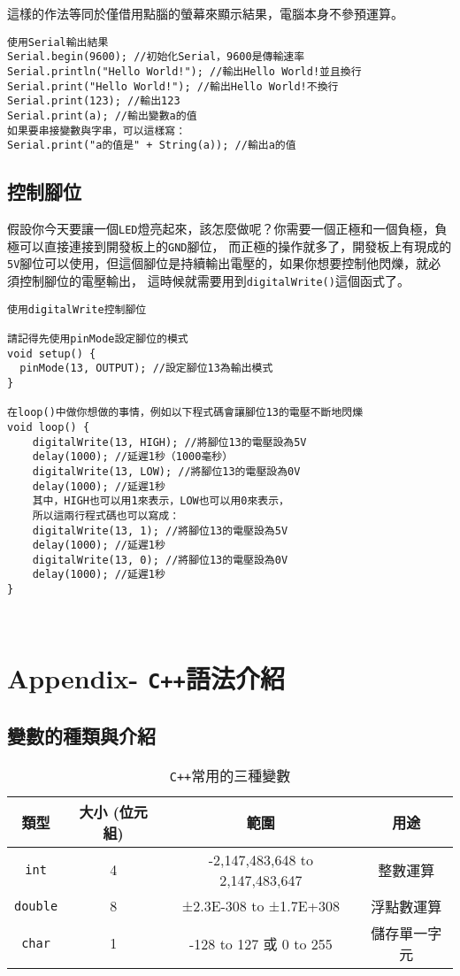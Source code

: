 \documentclass[12pt,a4paper]{article}
\begin{document}
這樣的作法等同於僅借用點腦的螢幕來顯示結果，電腦本身不參預運算。

\begin{lstlisting}
使用Serial輸出結果
Serial.begin(9600); //初始化Serial，9600是傳輸速率
Serial.println("Hello World!"); //輸出Hello World!並且換行
Serial.print("Hello World!"); //輸出Hello World!不換行
Serial.print(123); //輸出123
Serial.print(a); //輸出變數a的值
如果要串接變數與字串，可以這樣寫：
Serial.print("a的值是" + String(a)); //輸出a的值
\end{lstlisting}

\subsection{控制腳位}
假設你今天要讓一個\texttt{LED}燈亮起來，該怎麼做呢？你需要一個正極和一個負極，負極可以直接連接到開發板上的\texttt{GND}腳位，
而正極的操作就多了，開發板上有現成的\texttt{5V}腳位可以使用，但這個腳位是持續輸出電壓的，如果你想要控制他閃爍，就必須控制腳位的電壓輸出，
這時候就需要用到\texttt{digitalWrite()}這個函式了。
\begin{lstlisting}    
使用digitalWrite控制腳位

請記得先使用pinMode設定腳位的模式
void setup() {
  pinMode(13, OUTPUT); //設定腳位13為輸出模式
}

在loop()中做你想做的事情，例如以下程式碼會讓腳位13的電壓不斷地閃爍
void loop() {
    digitalWrite(13, HIGH); //將腳位13的電壓設為5V
    delay(1000); //延遲1秒（1000毫秒）
    digitalWrite(13, LOW); //將腳位13的電壓設為0V 
    delay(1000); //延遲1秒
    其中，HIGH也可以用1來表示，LOW也可以用0來表示，
    所以這兩行程式碼也可以寫成：
    digitalWrite(13, 1); //將腳位13的電壓設為5V
    delay(1000); //延遲1秒
    digitalWrite(13, 0); //將腳位13的電壓設為0V    
    delay(1000); //延遲1秒
}



\end{lstlisting}


\newpage
\section{Appendix- \texttt{C++}語法介紹}


\subsection{變數的種類與介紹}

\begin{table}[h!]
\centering
\begin{tabular}{|c||c|c|c|}
\hline
\textbf{類型} & \textbf{大小 (位元組)} & \textbf{範圍} & \textbf{用途} \\ \hline
\texttt{int} & 4 & -2,147,483,648 to 2,147,483,647 & 整數運算 \\ \hline
\texttt{double} & 8 & ±2.3E-308 to ±1.7E+308 & 浮點數運算 \\ \hline
\texttt{char} & 1 & -128 to 127 或 0 to 255 & 儲存單一字元 \\ \hline
\end{tabular}
\caption{\texttt{C++}常用的三種變數}
\label{tab:datatype_comparison}
\end{table}
\end{document}
